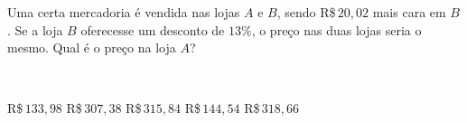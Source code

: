 \parbox{\linewidth}{

Uma certa mercadoria é vendida nas lojas $A$ e $B$, sendo R\$\,$20{,}02$ mais cara em $B$. Se a loja $B$ oferecesse um desconto de $13\%$, o preço nas duas lojas seria o mesmo. Qual é o preço na loja $A$?}\vspace{2mm}\\\parbox{\linewidth}{

R\$\,$133{,}98$
R\$\,$307{,}38$
R\$\,$315{,}84$
R\$\,$144{,}54$
R\$\,$318{,}66$

}

